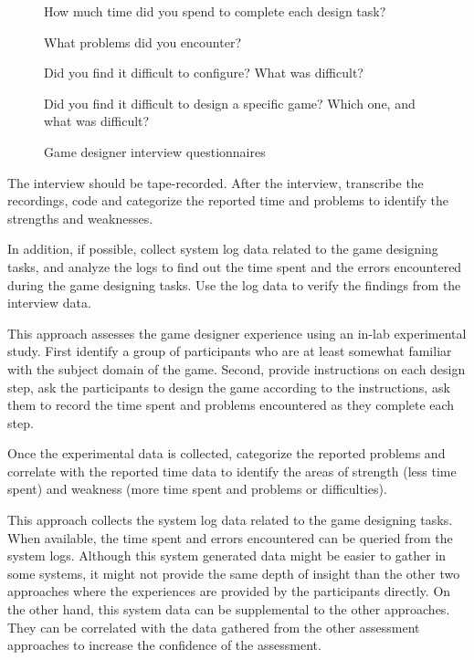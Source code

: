 \begin{figure}[ht!]
\begin{mybox}
\begin{compactenum}
\item How much time did you spend to complete each design task?
\item What problems did you encounter?
\item Did you find it difficult to configure? What was difficult?
\item Did you find it difficult to design a specific game? Which one, and what was difficult?
\end{compactenum}
\end{mybox}
\caption{Game designer interview questionnaires}
\label{fig:game-designer-interview}  
\end{figure}

The interview should be tape-recorded. After the interview, transcribe the recordings, code and categorize the reported 
time and problems to identify the strengths and weaknesses.

In addition, if possible, collect system log data related to the game designing tasks, and analyze the logs to find out the time 
spent and the errors encountered during the game designing tasks. Use the log data to verify the findings from the interview data.

\label{In-lab game design study}

This approach assesses the game designer experience using an in-lab experimental study.  First identify a group 
of participants who are at least somewhat familiar with the subject domain of the game. Second, provide instructions on 
each design step, ask the participants to design the game according to the instructions, ask them to record 
the time spent and problems encountered as they complete each step.

Once the experimental data is collected, categorize the reported problems and correlate with the reported time data 
to identify the areas of strength (less time spent) and weakness (more time spent and problems or difficulties). 

\label{Game design log data analysis}

This approach collects the system log data related to the game designing tasks. When
available, the time spent and errors encountered can be queried from the system logs. Although this
system generated data might be easier to gather in some systems, it might not provide the same
depth of insight than the other two approaches where the experiences are provided by the
participants directly. On the other hand, this system data can be supplemental to the other
approaches. They can be correlated with the data gathered from the other assessment approaches
 to increase the confidence of the assessment.

